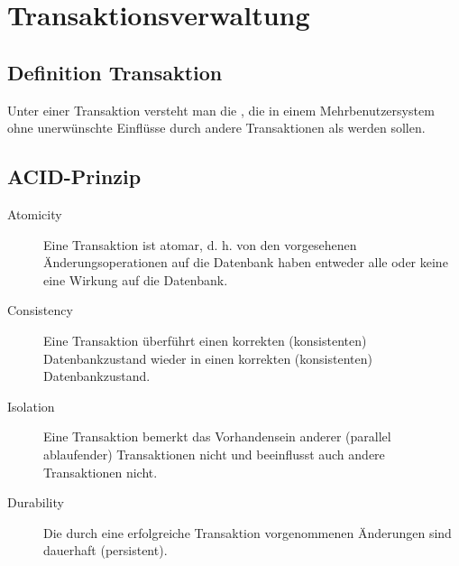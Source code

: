\documentclass{lehramt-informatik-haupt}
\begin{document}
\chapter{Transaktionsverwaltung}

\section{Definition Transaktion}

Unter einer Transaktion versteht man die , die in einem Mehrbenutzersystem ohne unerwünschte
Einflüsse durch andere Transaktionen als  werden sollen.

%

\section{ACID-Prinzip}

\begin{liQuellen}
\cite[Kapitel 9.5 „Eigenschaften von Transaktionen“, Seite 305]{kemper}
\cite[Seite 1]{db:fs:5}
\cite{wiki:acid}
\end{liQuellen}

\begin{description}
\item[Atomicity]

Eine Transaktion ist atomar, d. h. von den vorgesehenen
Änderungsoperationen auf die Datenbank haben entweder alle oder keine
eine Wirkung auf die Datenbank.

\item[Consistency]

Eine Transaktion überführt einen korrekten (konsistenten)
Datenbankzustand wieder in einen korrekten (konsistenten)
Datenbankzustand.

\item[Isolation]

Eine Transaktion bemerkt das Vorhandensein anderer (parallel
ablaufender) Transaktionen nicht und beeinflusst auch andere
Transaktionen nicht.

\item[Durability]

Die durch eine erfolgreiche Transaktion vorgenommenen Änderungen sind
dauerhaft (persistent).

\end{description}
\end{document}
